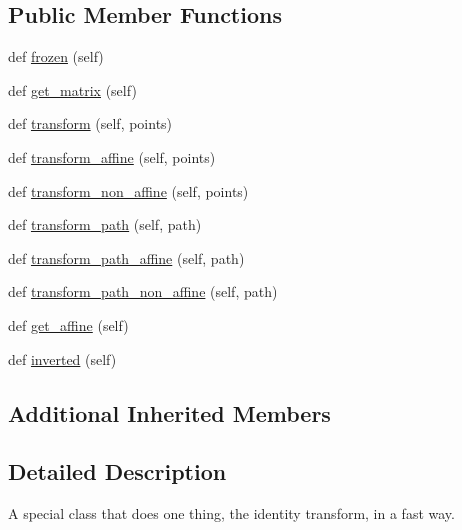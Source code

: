 \subsection*{Public Member Functions}
\begin{DoxyCompactItemize}
\item 
def \hyperlink{classmatplotlib_1_1transforms_1_1IdentityTransform_acc3f9dc8a29f2e6621399fd44a9cfc54}{frozen} (self)
\item 
def \hyperlink{classmatplotlib_1_1transforms_1_1IdentityTransform_a033c518a3f628f8013ee8fae0184bf30}{get\+\_\+matrix} (self)
\item 
def \hyperlink{classmatplotlib_1_1transforms_1_1IdentityTransform_a152e0f2760427f49897c4eed45e41050}{transform} (self, points)
\item 
def \hyperlink{classmatplotlib_1_1transforms_1_1IdentityTransform_a7b423a305c8d9589e4c5da3c11ba19fa}{transform\+\_\+affine} (self, points)
\item 
def \hyperlink{classmatplotlib_1_1transforms_1_1IdentityTransform_a11defef3f2efe3cdca23400c64c9a90d}{transform\+\_\+non\+\_\+affine} (self, points)
\item 
def \hyperlink{classmatplotlib_1_1transforms_1_1IdentityTransform_a1cb9ae68be8c0ee53945cc8295f60480}{transform\+\_\+path} (self, path)
\item 
def \hyperlink{classmatplotlib_1_1transforms_1_1IdentityTransform_a2475495494bfdc554609b6e4ba0b69ee}{transform\+\_\+path\+\_\+affine} (self, path)
\item 
def \hyperlink{classmatplotlib_1_1transforms_1_1IdentityTransform_ad23b39384c54960ba75fdcda0096c97f}{transform\+\_\+path\+\_\+non\+\_\+affine} (self, path)
\item 
def \hyperlink{classmatplotlib_1_1transforms_1_1IdentityTransform_a91b5163a852efdca5eadff3b9cc5572e}{get\+\_\+affine} (self)
\item 
def \hyperlink{classmatplotlib_1_1transforms_1_1IdentityTransform_a6cd903cfcbbe28599b5e18dd93a61de8}{inverted} (self)
\end{DoxyCompactItemize}
\subsection*{Additional Inherited Members}


\subsection{Detailed Description}
\begin{DoxyVerb}A special class that does one thing, the identity transform, in a
fast way.
\end{DoxyVerb}
 

